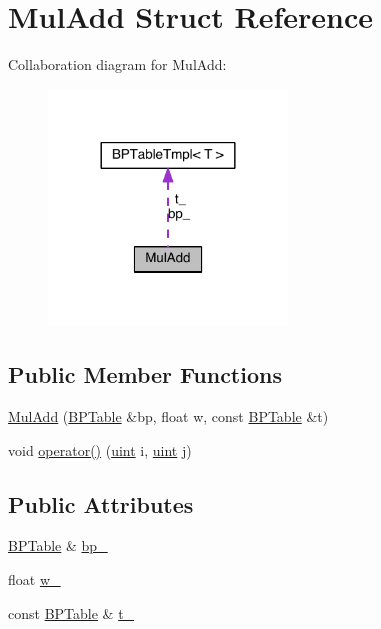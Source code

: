 \hypertarget{struct_mul_add}{\section{Mul\+Add Struct Reference}
\label{struct_mul_add}
}


Collaboration diagram for Mul\+Add\+:
\nopagebreak
\begin{figure}[H]
\begin{center}
\leavevmode
\includegraphics[width=180pt]{struct_mul_add__coll__graph}
\end{center}
\end{figure}
\subsection*{Public Member Functions}
\begin{DoxyCompactItemize}
\item 
\hyperlink{struct_mul_add_a6d6cd10bc8794d36e05c2aa6b7e5017d}{Mul\+Add} (\hyperlink{folding__engine_8h_a065821fb17bbd8df315f2435c973e3c1}{B\+P\+Table} \&bp, float w, const \hyperlink{folding__engine_8h_a065821fb17bbd8df315f2435c973e3c1}{B\+P\+Table} \&t)
\item 
void \hyperlink{struct_mul_add_a200f76dbb10df766e99a5ee9e8485e02}{operator()} (\hyperlink{cyktable_8h_a91ad9478d81a7aaf2593e8d9c3d06a14}{uint} i, \hyperlink{cyktable_8h_a91ad9478d81a7aaf2593e8d9c3d06a14}{uint} j)
\end{DoxyCompactItemize}
\subsection*{Public Attributes}
\begin{DoxyCompactItemize}
\item 
\hyperlink{folding__engine_8h_a065821fb17bbd8df315f2435c973e3c1}{B\+P\+Table} \& \hyperlink{struct_mul_add_a79aba94efccf5784e5f2a7481c4e7877}{bp\+\_\+}
\item 
float \hyperlink{struct_mul_add_a276a4503f05e81c57f9e668d792a9b90}{w\+\_\+}
\item 
const \hyperlink{folding__engine_8h_a065821fb17bbd8df315f2435c973e3c1}{B\+P\+Table} \& \hyperlink{struct_mul_add_a3dc017d7e72df73b290feedbd90b6696}{t\+\_\+}
\end{DoxyCompactItemize}


